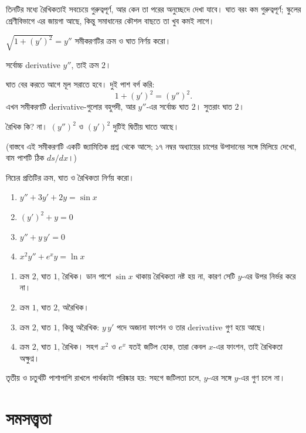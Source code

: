 \documentclass[11pt]{article}
\begin{document}
তিনটির মধ্যে রৈখিকতাই সবচেয়ে গুরুত্বপূর্ণ, আর কেন তা পরের অনুচ্ছেদে দেখা
যাবে। ঘাত বরং কম গুরুত্বপূর্ণ; স্কুলের শ্রেণীবিভাগে এর জায়গা আছে, কিন্তু
সমাধানের কৌশল বাছতে তা খুব কমই লাগে।

\begin{example}
$\sqrt{1 + (y')^{2}} = y''$ সমীকরণটির ক্রম ও ঘাত নির্ণয় করো।
\end{example}

\begin{solbox}
সর্বোচ্চ derivative $y''$, তাই ক্রম $2$।

ঘাত বের করতে আগে মূল সরাতে হবে। দুই পাশ বর্গ করি:
\[
  1 + (y')^{2} = (y'')^{2} .
\]
এখন সমীকরণটি derivative-গুলোর বহুপদী, আর $y''$-এর সর্বোচ্চ ঘাত $2$। সুতরাং
ঘাত $2$।

রৈখিক কি? না। $(y'')^{2}$ ও $(y')^{2}$ দুটিই দ্বিতীয় ঘাতে আছে।

(বাস্তবে এই সমীকরণটি একটি জ্যামিতিক প্রশ্ন থেকে আসে; ১৭ নম্বর অধ্যায়ের
চাপের উপাদানের সঙ্গে মিলিয়ে দেখো, বাম পাশটি ঠিক $ds/dx$।)
\end{solbox}

 নিচের প্রতিটির ক্রম, ঘাত ও রৈখিকতা নির্ণয় করো।
\begin{enumerate}
  \item $y'' + 3y' + 2y = \sin x$
  \item $(y')^{2} + y = 0$
  \item $y'' + y\,y' = 0$
  \item $x^{2}y'' + e^{x}y = \ln x$
\end{enumerate}

\begin{sol}
\begin{enumerate}
  \item ক্রম $2$, ঘাত $1$, রৈখিক। ডান পাশে $\sin x$ থাকায় রৈখিকতা নষ্ট হয়
        না, কারণ সেটি $y$-এর উপর নির্ভর করে না।
  \item ক্রম $1$, ঘাত $2$, অরৈখিক।
  \item ক্রম $2$, ঘাত $1$, কিন্তু অরৈখিক: $y\,y'$ পদে অজানা ফাংশন ও তার
        derivative গুণ হয়ে আছে।
  \item ক্রম $2$, ঘাত $1$, রৈখিক। সহগ $x^{2}$ ও $e^{x}$ যতই জটিল হোক, তারা
        কেবল $x$-এর ফাংশন, তাই রৈখিকতা অক্ষুণ্ন।
\end{enumerate}
তৃতীয় ও চতুর্থটি পাশাপাশি রাখলে পার্থক্যটা পরিষ্কার হয়: সহগে জটিলতা চলে,
$y$-এর সঙ্গে $y$-এর গুণ চলে না।
\end{sol}

\section{সমসত্ত্বতা}
\end{document}

